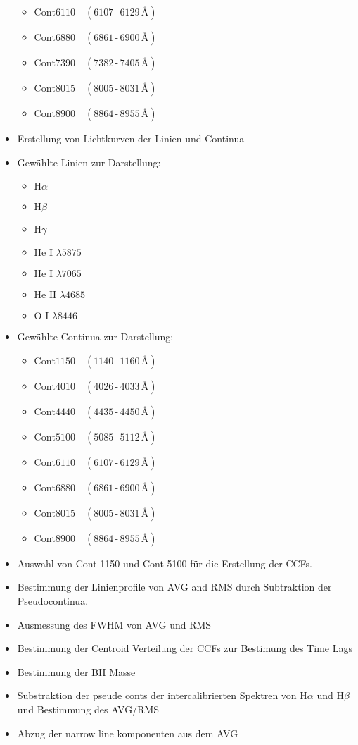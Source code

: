 \begin{itemize}
\begin{itemize}
		\item $\mathrm{Cont6110} \quad (6107\,\text{-}\,6129\,\text{\AA})$
		\item $\mathrm{Cont6880} \quad (6861\,\text{-}\,6900\,\text{\AA})$
		\item $\mathrm{Cont7390} \quad (7382\,\text{-}\,7405\,\text{\AA})$
		\item $\mathrm{Cont8015} \quad (8005\,\text{-}\,8031\,\text{\AA})$
		\item $\mathrm{Cont8900} \quad (8864\,\text{-}\,8955\,\text{\AA})$
	\end{itemize}
	\item Erstellung von Lichtkurven der Linien und Continua
	\item Gewählte Linien zur Darstellung: 
	\begin{itemize}
		\item \(\text{H}\alpha\)
		\item \(\text{H}\beta\)
		\item \(\text{H}\gamma\) 
		\item \(\text{He I } \lambda 5875\) 
		\item \(\text{He I } \lambda 7065\) 
		\item \(\text{He II } \lambda 4685\)
		\item \(\text{O I } \lambda 8446\)  
	\end{itemize}
	\item Gewählte Continua zur Darstellung: 
	\begin{itemize}
		\item $\mathrm{Cont1150} \quad (1140\,\text{-}\,1160\,\text{\AA})$
		\item $\mathrm{Cont4010} \quad (4026\,\text{-}\,4033\,\text{\AA})$
		\item $\mathrm{Cont4440} \quad (4435\,\text{-}\,4450\,\text{\AA})$
		\item $\mathrm{Cont5100} \quad (5085\,\text{-}\,5112\,\text{\AA})$
		\item $\mathrm{Cont6110} \quad (6107\,\text{-}\,6129\,\text{\AA})$
		\item $\mathrm{Cont6880} \quad (6861\,\text{-}\,6900\,\text{\AA})$
		\item $\mathrm{Cont8015} \quad (8005\,\text{-}\,8031\,\text{\AA})$
		\item $\mathrm{Cont8900} \quad (8864\,\text{-}\,8955\,\text{\AA})$ 
	
	\end{itemize}
	\item Auswahl von Cont 1150 und Cont 5100 für die Erstellung der CCFs.
	\item Bestimmung der Linienprofile von AVG and RMS durch Subtraktion der Pseudocontinua.
	\item Ausmessung des FWHM von AVG und RMS 
	\item Bestimmung der Centroid Verteilung der CCFs zur Bestimung des Time Lags
	\item Bestimmung der BH Masse
	\item Substraktion der pseude conts der intercalibrierten Spektren von $\text{H}\alpha$ und $\text{H}\beta$ und Bestimmung des AVG/RMS
	\item Abzug der narrow line komponenten aus dem AVG
	
\end{itemize}
